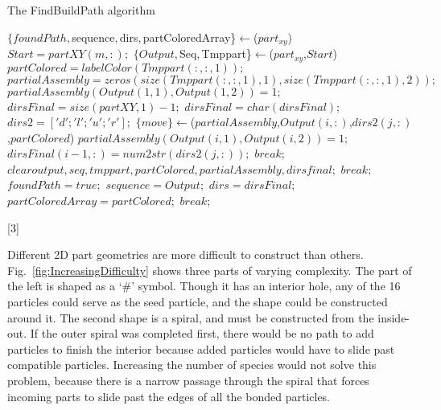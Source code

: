 \documentclass[letterpaper, 10 pt, conference]{ieeeconf}
\begin{document}
 
 
 
\begin{algorithm}
\newcommand\algotext[3]{\end{algorithmic}#3\begin{algorithmic}[3]}
\scriptsize 
\caption{The FindBuildPath algorithm}
\begin{algorithmic}[3]
\State$\{foundPath,$sequence$, $dirs$, $partColoredArray\}$\leftarrow${}($part_{xy}$)
\newline $Start = partXY(m,:);$
\State$\{Output, $Seq$, $Tmppart\}$\leftarrow${}($part_{xy}$,$Start$)
\newline $partColored = labelColor(Tmppart(:,:,1));$
$partialAssembly = zeros(size(Tmppart(:,:,1),1),size(Tmppart(:,:,1),2));$
$partialAssembly(Output(1,1),Output(1,2)) = 1;$
\newline$dirsFinal= size(partXY,1)-1;$
\newline $dirsFinal = char(dirsFinal);$
\newline $dirs2 = ['d';'l';'u';'r'];$
\State$\{move\}\leftarrow${}($partialAssembly$,\newline$Output(i,:)$,$dirs2(j,:)$,$partColored$)
$partialAssembly(Output(i,1),Output(i,2)) = 1;$
$dirsFinal(i-1,:) = num2str(dirs2(j,:));$
\newline $break;$
\EndIf
\EndFor
{}
\newline$clear output, seq, tmppart, partColored, partialAssembly, dirsfinal;$
$break;$
\EndIf
{}
\newline$foundPath=true; $
\EndIf
\EndFor
{}
\newline$sequence = Output;$
$dirs = dirsFinal;$
$partColoredArray = partColored;$
$break;$ 
\EndIf
\EndFor
\end{algorithmic}[3]
\end{algorithm} 
  
 
 
 
 



Different 2D part geometries are more difficult to construct than others.  Fig.~\ref{fig:IncreasingDifficulty} shows three parts of varying complexity.  The part of the left is shaped as a `\#' symbol.  Though it has an interior hole, any of the 16 particles could serve as the seed particle, and the shape could be constructed around it.  The second shape is a spiral, and must be constructed from the inside-out.  If the outer spiral was completed first, there would be no path to add particles to finish the interior because added particles would have to slide past compatible particles.  Increasing the number of species would not solve this problem, because there is a narrow passage through the spiral that forces incoming parts to slide past the edges of all the bonded particles.
\end{document}
